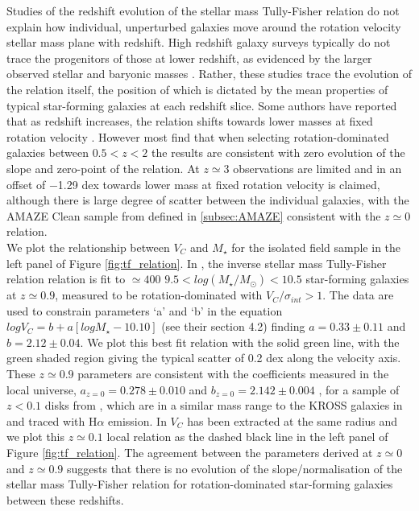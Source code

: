 \documentclass[fleqn,usenatbib]{mn2e}
\begin{document}
Studies of the redshift evolution of the stellar mass Tully-Fisher relation do not explain how individual, unperturbed galaxies move around the rotation velocity stellar mass plane with redshift. 
High redshift galaxy surveys typically do not trace the progenitors of those at lower redshift, as evidenced by the larger observed stellar and baryonic masses \citep[e.g.][]{Cresci2009,Reyes2011,Wisnioski2015,Ubler2017}.
Rather, these studies trace the evolution of the relation itself, the position of which is dictated by the mean properties of typical star-forming galaxies at each redshift slice.
Some authors have reported that as redshift increases, the relation shifts towards lower masses at fixed rotation velocity \citep[e.g.][]{Puech2008,Cresci2009,Puech2010,Straatman2017,Ubler2017}.
However most find that when selecting rotation-dominated galaxies between $0.5 < z < 2$ \citep[e.g.][]{Flores2006,Miller2011,Kassin2012,Miller2012,Vergani2012,Miller2014,Contini2015a,Molina2016,DiTeodoro2016,Simons2016,Pelliccia2017,Harrison2017} the results are consistent with zero evolution of the slope and zero-point of the relation.
At $z\simeq3$ observations are limited and in \cite{Gnerucci2011} an offset of $-$1.29 dex towards lower mass at fixed rotation velocity is claimed, although there is large degree of scatter between the individual galaxies, with the AMAZE Clean sample from \cite{Gnerucci2011} defined in \cref{subsec:AMAZE} consistent with the $z\simeq0$ relation. \\

We plot the relationship between $V_{C}$ and $M_{\star}$ for the isolated field sample in the left panel of Figure \ref{fig:tf_relation}.
In \cite{Harrison2017}, the inverse stellar mass Tully-Fisher relation relation is fit to $\simeq400$ $9.5 < log(M_{\star}/M_{\odot}) < 10.5$ star-forming galaxies at $z\simeq0.9$, measured to be rotation-dominated with $V_{C}/\sigma_{int} > 1$.
The data are used to constrain parameters `a' and `b' in the equation $logV_{C}=b+a[logM_{\star} - 10.10]$ (see their section 4.2) finding $a = 0.33 \pm 0.11$ and $b = 2.12 \pm 0.04$.
We plot this best fit relation with the solid green line, with the green shaded region giving the typical scatter of 0.2 dex along the velocity axis.
These $z\simeq0.9$ parameters are consistent with the coefficients measured in the local universe, $a_{z=0} = 0.278 \pm 0.010$ and $b_{z=0} = 2.142 \pm 0.004$ , for a sample of $z<0.1$ disks from \cite{Reyes2011}, which are in a similar mass range to the KROSS galaxies in \cite{Harrison2017} and traced with H$\alpha$ emission.
In \cite{Reyes2011} $V_{C}$ has been extracted at the same radius and we plot this $z\simeq0.1$ local relation as the dashed black line in the left panel of Figure \ref{fig:tf_relation}.
The agreement between the parameters derived at $z\simeq0$ and $z\simeq0.9$ suggests that there is no evolution of the slope/normalisation of the stellar mass Tully-Fisher relation for rotation-dominated star-forming galaxies between these redshifts. \\
\end{document}

